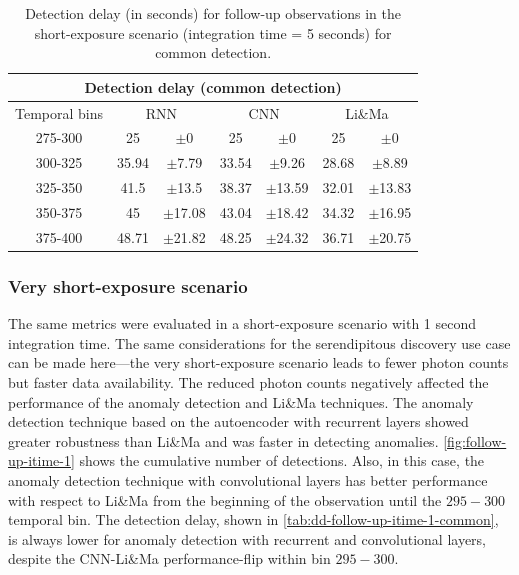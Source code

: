 \begin{table}[!ht]
\centering
\begin{tabular}{|c|cc|cc|cc|} 
\hline
\multicolumn{7}{|c|}{\textbf{Detection delay} (common detection)} \\ 
\hline
\multicolumn{1}{|c|}{Temporal bins} & \multicolumn{2}{c|}{RNN} & \multicolumn{2}{c|}{CNN} & \multicolumn{2}{c|}{Li\&Ma} \\ 
\hline
275-300 &  25    & $\pm$0 & 25 &  $\pm$0 & 25 &  $\pm$0  \\
300-325 & 35.94 & $\pm$7.79 & 33.54 &  $\pm$9.26 & 28.68 &  $\pm$8.89 \\
325-350 & 41.5  & $\pm$13.5 & 38.37 & $\pm$13.59 & 32.01 & $\pm$13.83 \\
350-375 & 45    & $\pm$17.08 & 43.04 & $\pm$18.42 & 34.32 & $\pm$16.95  \\
375-400 & 48.71 & $\pm$21.82 & 48.25 & $\pm$24.32 & 36.71 & $\pm$20.75  \\
\hline
\end{tabular}
\caption{Detection delay (in seconds) for follow-up observations in the short-exposure scenario (integration time = 5 seconds) for common detection.}
\label{tab:dd-follow-up-itime-5-common}
\end{table}
 

\FloatBarrier
\subsubsection{Very short-exposure scenario}
\label{s:Follow-Up-Observation-Results-Very-Short-Term}
The same metrics were evaluated in a short-exposure scenario with 1 second integration time. The same considerations for the serendipitous discovery use case can be made here—the very short-exposure scenario leads to fewer photon counts but faster data availability. The reduced photon counts negatively affected the performance of the anomaly detection and Li\&Ma techniques. The anomaly detection technique based on the autoencoder with recurrent layers showed greater robustness than Li\&Ma and was faster in detecting anomalies. \autoref{fig:follow-up-itime-1} shows the cumulative number of detections. Also, in this case, the anomaly detection technique with convolutional layers has better performance with respect to Li\&Ma from the beginning of the observation until the $295-300$ temporal bin. The detection delay, shown in \autoref{tab:dd-follow-up-itime-1-common}, is always lower for anomaly detection with recurrent and convolutional layers, despite the CNN-Li\&Ma performance-flip within bin $295-300$.



